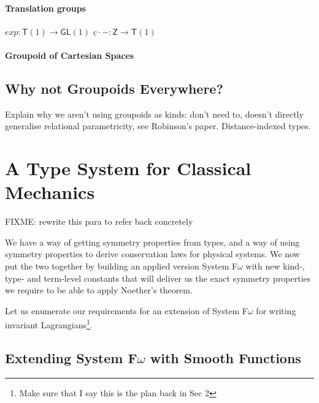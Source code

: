 \documentclass[preprint]{sigplanconf}
\theoremstyle{examplestyle}
\begin{document}
\paragraph{Translation groups}

$\mathit{exp} : \mathsf{T}(1) \to \mathsf{GL}(1)$
$\underline{c}\cdot- : \mathsf{Z} \to \mathsf{T}(1)$

\paragraph{Groupoid of Cartesian Spaces}


\subsection{Why not Groupoids Everywhere?}

Explain why we aren't using groupoids as kinds: don't need to, doesn't
directly generalise relational parametricity, see Robinson's
paper. Distance-indexed types.

\section{A Type System for Classical Mechanics}
\label{sec:types-for-classical-mech}

FIXME: rewrite this para to refer back concretely

We have a way of getting symmetry properties from types, and a way of
using symmetry properties to derive conservation laws for physical
systems. We now put the two together by building an applied version
System F$\omega$ with new kind-, type- and term-level constants that
will deliver us the exact symmetry properties we require to be able to
apply Noether's theorem.


Let us enumerate our requirements for an extension of System F$\omega$
for writing invariant Lagrangians\footnote{Make sure that I say this
  is the plan back in Sec 2}.

\subsection{Extending System F$\omega$ with Smooth Functions}
\end{document}
